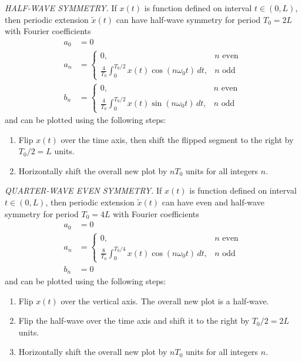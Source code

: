 \documentclass{report}
\begin{document}
\begin{tcolorbox}[width=\textwidth,colback={white}, sharp corners]
    \emph{HALF-WAVE SYMMETRY.}
    If $x(t)$ is function defined on interval $t\in(0,L)$, then periodic extension $\tilde{x}(t)$ can have half-wave symmetry for period $T_0=2L$ with 
    Fourier coefficients 
    \begin{align}
        a_0 &= 0 \\
        a_n &= 
        \begin{cases}
            0, & n \text{ even} \\
            \frac{4}{T_0}\int_{0}^{T_0/2} x(t)\cos(n\omega_0 t) \,dt, & n \text{ odd}
        \end{cases} \\
        b_n &= 
        \begin{cases}
            0, & n \text{ even} \\
            \frac{4}{T_0}\int_{0}^{T_0/2} x(t)\sin(n\omega_0 t) \,dt, & n \text{ odd}
        \end{cases}
    \end{align}
    and can be plotted using the following steps:
    \begin{enumerate}
        \item Flip $x(t)$ over the time axis, then shift the flipped segment to the right by $T_0/2 = L$ units.
        \item Horizontally shift the overall new plot by $nT_0$ units for all integers $n$.
    \end{enumerate}
\end{tcolorbox}
\begin{tcolorbox}[width=\textwidth,colback={white}, sharp corners]
    \emph{QUARTER-WAVE EVEN SYMMETRY.}
    If $x(t)$ is function defined on interval $t\in(0,L)$, then periodic extension $\tilde{x}(t)$ can have even and half-wave symmetry for period $T_0=4L$ with 
    Fourier coefficients 
    \begin{align}
        a_0 &= 0 \\
        a_n &= 
        \begin{cases}
            0, & n \text{ even} \\
            \frac{8}{T_0}\int_{0}^{T_0/4} x(t)\cos(n\omega_0 t) \,dt, & n \text{ odd}
        \end{cases} \\
        b_n &= 0
    \end{align}
    and can be plotted using the following steps:
    \begin{enumerate}
        \item Flip $x(t)$ over the vertical axis. The overall new plot is a half-wave.
        \item Flip the half-wave over the time axis and shift it to the right by $T_0/2 = 2L$ units.
        \item Horizontally shift the overall new plot by $nT_0$ units for all integers $n$.
    \end{enumerate}
\end{tcolorbox}
\end{document}
